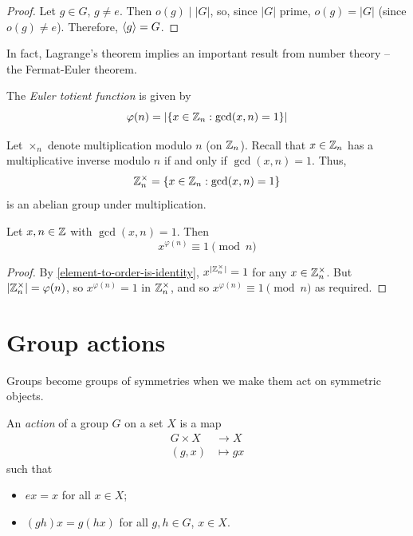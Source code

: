 \documentclass{../template/note}
\begin{document}
    \begin{proof}
        Let \(g \in G\), \(g \neq e\). Then \(o(g) \mid |G|\), so, since \(|G|\) prime, \(o(g) = |G|\) (since \(o(g) \neq e\)). Therefore, \(\left \langle g \right \rangle = G\).
    \end{proof}
    
    In fact, Lagrange's theorem implies an important result from number theory -- the Fermat-Euler theorem.

    \begin{definition}
        The \emph{Euler totient function} is given by
        \[
            \varphi(n) = |\{x \in \mathbb Z_n : \gcd(x,n)=1\}|
        \]
    \end{definition}
    

    Let \(\times_n\) denote multiplication modulo \(n\) (on \(\mathbb Z_n\)). Recall that \(x \in \mathbb Z_n\) has a multiplicative inverse modulo \(n\) if and only if \(\gcd(x, n) = 1\). Thus,
    \[
        \mathbb Z_n^\times = \{x \in \mathbb Z_n : \gcd(x, n) = 1\}
    \]
    is an abelian group under multiplication.

    \begin{theorem}
        Let \(x, n \in \mathbb Z\) with \(\gcd(x, n) = 1\). Then
        \[
            x^{\varphi(n)} \equiv 1 \pmod n
        \]
    \end{theorem}
    
    \begin{proof}
        By \cref{element-to-order-is-identity}, \(x^{|\mathbb Z_n^\times|} = 1\) for any \(x \in \mathbb Z_n^\times\). But \(|\mathbb Z_n^\times| = \varphi(n)\), so \(x^{\varphi(n)} = 1\) in \(\mathbb Z_n^\times\), and so \(x^{\varphi(n)} \equiv 1 \pmod n\) as required.
    \end{proof}
    
    \section{Group actions}

    Groups become groups of symmetries when we make them act on symmetric objects.

    \begin{definition}
        An \emph{action} of a group \(G\) on a set \(X\) is a map
        \begin{align*}
            G \times X &\to X \\
            (g, x) &\mapsto gx
        \end{align*}
        such that
        \begin{itemize}
            \item \(ex = x\) for all \(x \in X\);
            \item \((gh)x = g(hx)\) for all \(g, h \in G\), \(x \in X\).
        \end{itemize}        
    \end{definition}
\end{document}
